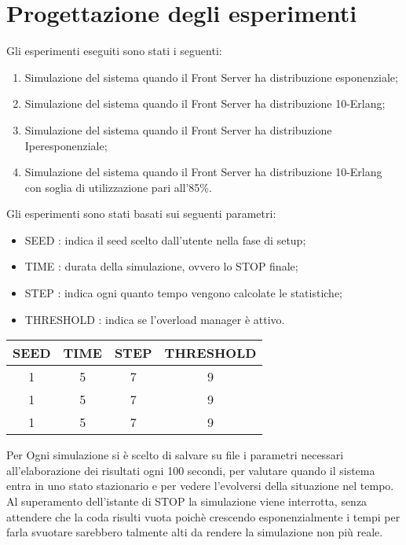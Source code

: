 \chapter{Progettazione degli esperimenti} 

\noindent Gli esperimenti eseguiti sono stati i seguenti:

\begin{enumerate}
 \item Simulazione del sistema quando il Front Server ha distribuzione esponenziale;
 \item Simulazione del sistema quando il Front Server ha distribuzione 10-Erlang;
 \item Simulazione del sistema quando il Front Server ha distribuzione Iperesponenziale;
 \item Simulazione del sistema quando il Front Server ha distribuzione 10-Erlang con soglia di utilizzazione pari all'85\%.
\end{enumerate}

\noindent \vspace{0.5cm} Gli esperimenti sono stati basati sui seguenti parametri:
\begin{itemize}
 \item SEED : indica il seed scelto dall'utente nella fase di setup;
 \item TIME : durata della simulazione, ovvero lo STOP finale;
 \item STEP : indica ogni quanto tempo vengono calcolate le statistiche;
 \item THRESHOLD : indica se l'overload manager è attivo.
\end{itemize}

\begin{table}[H]
 \centering
 \begin{tabular}{|c|c|c|c|}
 \hline
 SEED & TIME & STEP & THRESHOLD\\ \hline
 1 & 5 & 7 & 9 \\ \hline
 1 & 5 & 7 & 9 \\ \hline
 1 & 5 & 7 & 9 \\ \hline
 \end{tabular}
\end{table}


Per Ogni simulazione si è scelto di salvare su file i parametri necessari all'elaborazione dei risultati ogni 100 secondi, per valutare quando il sistema entra in uno stato stazionario e per vedere l'evolversi della situazione nel tempo. Al superamento dell'istante di STOP la simulazione viene interrotta, senza attendere che la coda risulti vuota poichè crescendo esponenzialmente i tempi per farla svuotare sarebbero talmente alti da rendere la simulazione non più reale.